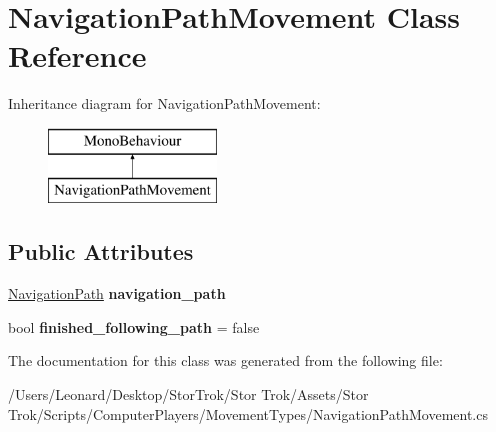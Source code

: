 \hypertarget{class_navigation_path_movement}{}\section{Navigation\+Path\+Movement Class Reference}
\label{class_navigation_path_movement}
Inheritance diagram for Navigation\+Path\+Movement\+:\begin{figure}[H]
\begin{center}
\leavevmode
\includegraphics[height=2.000000cm]{class_navigation_path_movement}
\end{center}
\end{figure}
\subsection*{Public Attributes}
\begin{DoxyCompactItemize}
\item 
\mbox{\label{class_navigation_path_movement_a9f4a2b40391b762dcf690694ed9f16b9}} 
\hyperlink{class_navigation_path}{Navigation\+Path} {\bfseries navigation\+\_\+path}
\item 
\mbox{\label{class_navigation_path_movement_a692e7ad3c064c9e97a0d5db065aed3f0}} 
bool {\bfseries finished\+\_\+following\+\_\+path} = false
\end{DoxyCompactItemize}


The documentation for this class was generated from the following file\+:\begin{DoxyCompactItemize}
\item 
/\+Users/\+Leonard/\+Desktop/\+Stor\+Trok/\+Stor Trok/\+Assets/\+Stor Trok/\+Scripts/\+Computer\+Players/\+Movement\+Types/Navigation\+Path\+Movement.\+cs\end{DoxyCompactItemize}
